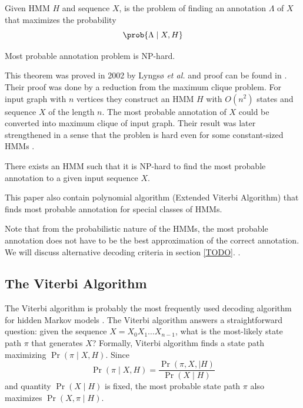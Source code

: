\begin{definition}
Given HMM $H$ and sequence $X$,  is the problem of finding an annotation $\Lambda$ of $X$ that maximizes
the probability \[\prob{\Lambda\mid X,H}\]
\end{definition}

\begin{theorem}
Most probable annotation problem is NP-hard.
\end{theorem}
This theorem was proved in 2002 by Lyngsø {\it et al.} and proof can be found in
\cite{Lyngso2002}. Their proof was done by a reduction from the maximum clique problem.
For input graph with $n$ vertices they construct an HMM $H$ with $O(n^2)$ states and
sequence $X$ of the length $n$. The most probable annotation of $X$ could be
converted into maximum clique of input graph. 
Their result was later strengthened in a sense that the problen is hard even for some constant-sized HMMs \cite{Brejova2007mpa}.

\begin{theorem}
There exists an HMM such that it is NP-hard to find the most probable annotation
to a given input sequence $X$.
\end{theorem}
This paper also
contain polynomial algorithm (Extended Viterbi Algorithm) that finds most
probable annotation for special classes of HMMs. 

Note that from the probabilistic nature of the HMMs, the most probable
annotation does not have to be the best approximation of the correct annotation.
We will discuss alternative decoding criteria in section \ref{TODO}.
\nocite{Brown2010,Gross2007,Nanasi2010,Truszkowski2011}.

\subsection{The Viterbi Algorithm}
The Viterbi algorithm  is probably the most frequently used
decoding algorithm for hidden Markov
models \cite{Durbin1998}.
The Viterbi algorithm answers a straightforward question: given the sequence
$X=X_0X_1\dots X_{n-1}$, what
is the most-likely state path $\pi$ that generates $X$? Formally, Viterbi
algorithm finds a state path maximizing $\Pr\left( \pi\mid X,H \right)$. Since
\[\Pr\left(\pi\mid X,H\right) = \frac{\Pr\left(\pi,X,\mid
H\right)}{\Pr\left(X\mid H\right)}\] and quantity $\Pr\left(X\mid H\right)$ is
fixed, the most probable state path $\pi$ also maximizes $\Pr\left(X,\pi\mid H\right)$. 

